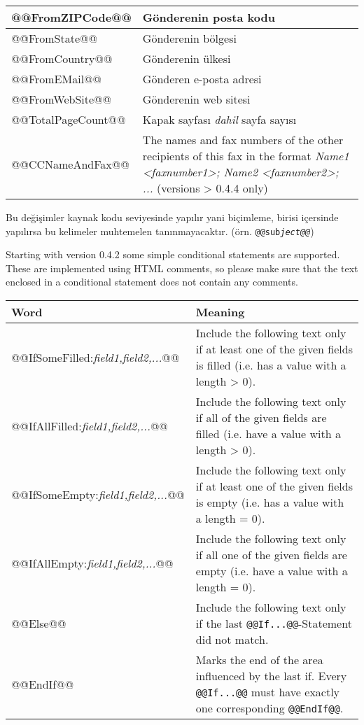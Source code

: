 \documentclass[a4paper,10pt]{scrartcl}
\begin{document}
\begin{center}
\begin{tabular}{|l|p{}|}
\ttfamily @@FromZIPCode@@ & Gönderenin posta kodu \\\hline
\ttfamily @@FromState@@ & Gönderenin bölgesi\\\hline
\ttfamily @@FromCountry@@ & Gönderenin ülkesi\\\hline
\ttfamily @@FromEMail@@ & Gönderen e-posta adresi\\\hline
\ttfamily @@FromWebSite@@ & Gönderenin web sitesi\\\hline
\ttfamily @@TotalPageCount@@ & Kapak sayfası \textit{dahil} sayfa sayısı\\\hline
\ttfamily @@CCNameAndFax@@ & The names and fax numbers of the other recipients of this fax in the format \textit{Name1 <faxnumber1>; Name2 <faxnumber2>; ...} (versions > 0.4.4 only)\\\hline
\end{tabular}
\end{center}

Bu değişimler kaynak kodu seviyesinde yapılır yani biçimleme, birisi içersinde yapılırsa bu kelimeler muhtemelen tanınmayacaktır. (örn. \texttt{@@sub\textit{ject@@}})

Starting with version 0.4.2 some simple conditional statements are supported. These are implemented using HTML comments, so please make sure that the text enclosed in a conditional statement does not contain any comments.
\begin{center}
\begin{tabular}{|l|p{}|}
\hline
\bfseries Word & \bfseries Meaning \\
\hline\hline
\ttfamily @@IfSomeFilled:\textit{field1,field2,...}@@ & Include the following text only if at least one of the given fields is filled (i.e. has a value with a length > 0).\\\hline
\ttfamily @@IfAllFilled:\textit{field1,field2,...}@@ & Include the following text only if all of the given fields are filled (i.e. have a value with a length > 0).\\\hline
\ttfamily @@IfSomeEmpty:\textit{field1,field2,...}@@ & Include the following text only if at least one of the given fields is empty (i.e. has a value with a length = 0).\\\hline
\ttfamily @@IfAllEmpty:\textit{field1,field2,...}@@ & Include the following text only if all one of the given fields are empty (i.e. have a value with a length = 0).\\\hline
\ttfamily @@Else@@ & Include the following text only if the last \texttt{@@If...@@}-Statement did not match.\\\hline
\ttfamily @@EndIf@@ & Marks the end of the area influenced by the last if. Every \texttt{@@If...@@} must have exactly one corresponding \texttt{@@EndIf@@}.\\\hline
\end{tabular}
\end{center}
\end{document}
